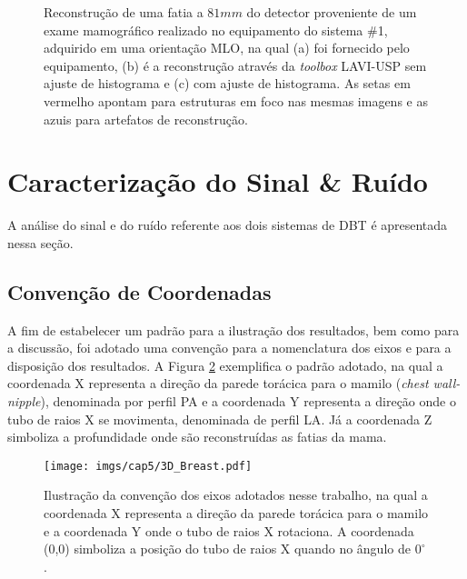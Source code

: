 \begin{figure}[!ht]
	\centering	
	\caption{Reconstrução de uma fatia a $81mm$ do detector proveniente de um exame mamográfico realizado no equipamento do sistema \#1, adquirido em uma orientação \acs{MLO}, na qual (a) foi fornecido pelo equipamento, (b) é a reconstrução através da \textit{toolbox} LAVI-USP sem ajuste de histograma e (c) com ajuste de histograma. As setas em vermelho apontam para estruturas em foco nas mesmas imagens e as azuis para artefatos de reconstrução. }
		
	
	\hfil
	\label{fig:imgCap6ClinicalGEMLO}
\end{figure}


\section{Caracterização do Sinal  \& Ruído} 

A análise do sinal e do ruído referente aos dois sistemas de \acs{DBT} é apresentada nessa seção. 

\subsection{Convenção de Coordenadas}

A fim de estabelecer um padrão para a ilustração dos resultados, bem como para a discussão, foi adotado uma convenção para a nomenclatura dos eixos e para a disposição dos resultados. A Figura \ref{fig:imgCap63DVolume} exemplifica o padrão adotado, na qual a coordenada X representa a direção da parede torácica para o mamilo (\textit{chest wall-nipple}), denominada por perfil \ac{PA} e a coordenada Y representa a direção onde o tubo de raios X se movimenta, denominada de perfil \ac{LA}. Já a coordenada Z simboliza a profundidade onde são reconstruídas as fatias da mama.

\begin{figure}[!ht]
	\caption{Ilustração da convenção dos eixos adotados nesse trabalho, na qual a coordenada X representa a direção da parede torácica para o mamilo e a coordenada Y onde o tubo de raios X rotaciona. A coordenada (0,0) simboliza a posição do tubo de raios X quando no ângulo de $0^{\circ}$.}
	\begin{center}
		\texttt{[image: imgs/cap5/3D\_Breast.pdf]}
	\end{center}
	\label{fig:imgCap63DVolume}
\end{figure} 

